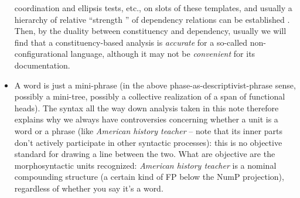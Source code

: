 \documentclass[a4paper, oneside]{report}
\newcommand*{\citesec}[1]{\S~{#1}}
\newcommand{\form}[1]{\emph{#1}}
\begin{document}
\begin{itemize}
        coordination and ellipsis tests, etc.,
        on slots of these templates, 
        and usually a hierarchy of 
        relative ``strength '' of dependency relations
        can be established 
        \citep[\citesec{1.6}]{danckaert2017development}.
        Then, by the duality between constituency and dependency, 
        usually we will find 
        that a constituency-based analysis is \emph{accurate} for 
        a so-called non-configurational language, 
        although it may not be \emph{convenient} 
        for its documentation.
    \item A word is just a mini-phrase 
        (in the above phase-as-descriptivist-phrase sense, 
        possibly a mini-tree, possibly a collective realization of a span of functional heads).
        The syntax all the way down analysis taken in this note 
        therefore explains why we always have controversies 
        concerning whether a unit is a word or a phrase 
        (like \form{American history teacher} 
        -- note that its inner parts don't actively participate in other syntactic processes):
        this is no objective standard for drawing a line between the two. 
        What are objective are the morphosyntactic units recognized: 
        \form{American history teacher} is a nominal compounding structure 
        (a certain kind of FP below the NumP projection),
        regardless of whether you say it's a word. 


\end{itemize}
\end{document}
